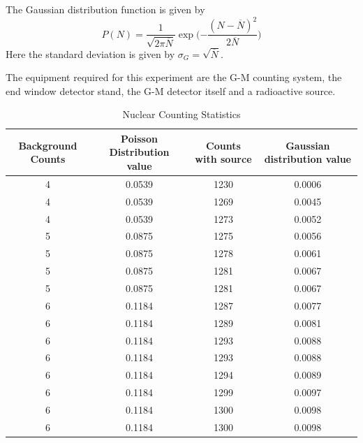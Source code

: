 \documentclass[%
 reprint,
nofootinbib,
 amsmath,amssymb,
 aps,
floatfix,
]{revtex4-2}
\begin{document}
        \par
        The Gaussian distribution function is given by
        \begin{equation}
            P(N) = \dfrac{1}{\sqrt{2 \pi \overline{N}}} \exp \Bigg({- \dfrac{(N - \overline{N})^2}{2 \overline{N}}} \Bigg)
        \end{equation}
        Here the standard deviation is given by $\sigma_G = \sqrt{\overline{N}}$.
        \par
        The equipment required for this experiment are the G-M counting system, the end window detector stand, the G-M detector itself and a radioactive source.
        \begin{table}[]
        \caption{Nuclear Counting Statistics}
        \label{tab:my-table}
        \setlength{\tabcolsep}{12pt}
        \begin{tabular}{@{}cccc@{}}
        \toprule
        \textbf{Background Counts} & \textbf{Poisson Distribution value} & \textbf{Counts with source} & \textbf{Gaussian distribution value} \\ \midrule
        4         & 0.0539  & 1230               & 0.0006   \\
        4         & 0.0539  & 1269               & 0.0045   \\
        4         & 0.0539  & 1273               & 0.0052   \\
        5         & 0.0875  & 1275               & 0.0056   \\
        5         & 0.0875  & 1278               & 0.0061   \\
        5         & 0.0875  & 1281               & 0.0067   \\
        5         & 0.0875  & 1281               & 0.0067   \\
        6         & 0.1184  & 1287               & 0.0077   \\
        6         & 0.1184  & 1289               & 0.0081   \\
        6         & 0.1184  & 1293               & 0.0088   \\
        6         & 0.1184  & 1293               & 0.0088   \\
        6         & 0.1184  & 1294               & 0.0089   \\
        6         & 0.1184  & 1299               & 0.0097   \\
        6         & 0.1184  & 1300               & 0.0098   \\
        6         & 0.1184  & 1300               & 0.0098   \\

\end{tabular}
\end{table}
\end{document}
